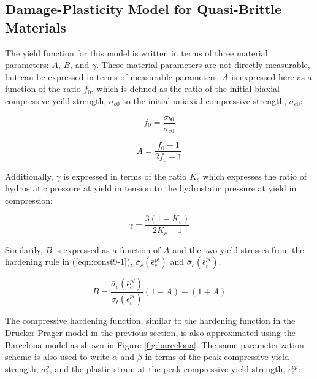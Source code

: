 \subsection{Damage-Plasticity Model for Quasi-Brittle Materials}

The yield function for this model is written in terms of three material parameters: $A$, $B$, and $\gamma$. These material parameters are not directly measurable, but can be expressed in terms of measurable parameters. $A$ is expressed here as a function of the ratio $f_0$, which is defined as the ratio of the initial biaxial compressive yeild strength, $\sigma_{b0}$ to the initial uniaxial compressive strength, $\sigma_{c0}$:

\begin{equation}
f_0 = \frac{\sigma_{b0}}{\sigma_{c0}}
\label{eqn:param1a}
\end{equation}

\begin{equation}
A = \frac{f_0-1}{2f_0-1}
\label{eqn:param1}
\end{equation}

Additionally, $\gamma$ is expressed in terms of the ratio $K_c$ which expresses the ratio of hydrostatic pressure at yield in tension to the hydrostatic pressure at yield in compression:

\begin{equation}
\gamma = \frac{3\left(1-K_c \right)}{2K_c-1}
\label{eqn:param1-3}
\end{equation}

Similarily, $B$ is expressed as a function of $A$ and the two yield stresses from the hardening rule in (\ref{eqn:const9-1}), $\bar{\sigma}_c\left(\bar{\epsilon}^{pl}_c\right)$ and $\bar{\sigma}_c\left(\bar{\epsilon}^{pl}_t\right)$.

\begin{equation}
B = \frac{\bar{\sigma}_c\left(\bar{\epsilon}^{pl}_c\right)}{\bar{\sigma}_t\left(\bar{\epsilon}^{pl}_t\right)}\left(1-A \right )-\left( 1+A \right)
\label{eqn:param1-2}
\end{equation}

The compressive hardening function, similar to the hardening function in the Drucker-Prager model in the previous section, is also approximated using the Barcelona model as shown in Figure \ref{fig:barcelona}. The same parameterization scheme is also used to write $\alpha$ and $\beta$ in terms of the peak compressive yield strength, $\sigma_{c}^{p}$, and the plastic strain at the peak compressive yield strength, $\epsilon_c^{pp}$:

